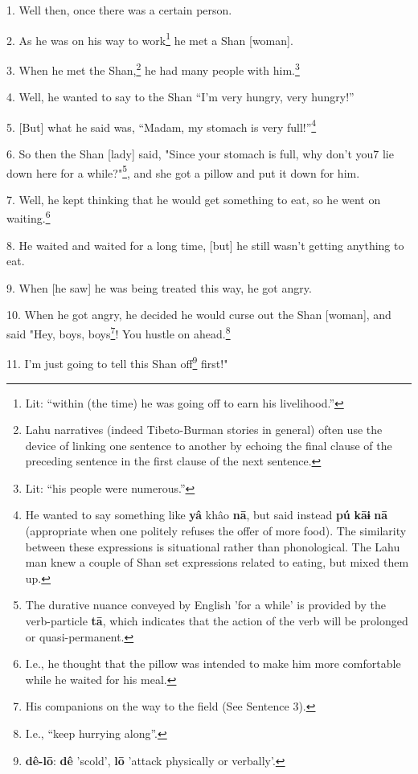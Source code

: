 \setcounter{footnote}{0}

1. Well then, once there was a certain person.

2. As he was on his way to work\footnote{Lit: ``within (the time) he was going off to earn his livelihood.''} he met a Shan [woman].

3. When he met the Shan,\footnote{Lahu narratives (indeed Tibeto-Burman stories in general) often use the device of linking one sentence to another by echoing the final clause of the preceding sentence in the first clause of the next sentence.} he had many people with him.\footnote{Lit: ``his people were numerous.''}

4. Well, he wanted to say to the Shan ``I'm very hungry, very hungry!''

5. [But] what he said was, ``Madam, my stomach is very full!''\footnote{He wanted to say something like \textbf{yâ} khâo \textbf{nā}, but said instead \textbf{pú} \textbf{kāɨ} \textbf{nā} (appropriate when one politely refuses the offer of more food). The similarity between these expressions is situational rather than phonological. The Lahu man knew a couple of Shan set expressions related to eating, but mixed them up.}

6. So then the Shan [lady] said, "Since your stomach is full, why don't
you7 lie down here for a while?"\footnote{The durative nuance conveyed by English 'for a while' is provided by the verb-particle \textbf{tā}, which indicates that the action of the verb will be prolonged or quasi-permanent.}, and she got a pillow and put it
down for him.

7. Well, he kept thinking that he would get something to eat, so he went on waiting.\footnote{I.e., he thought that the pillow was intended to make him more comfortable while he waited for his meal.}

8. He waited and waited for a long time, [but] he still wasn't getting anything
to eat.

9. When [he saw] he was being treated this way, he got angry.

10. When he got angry, he decided he would curse out the Shan [woman], and said
"Hey, boys, boys\footnote{His companions on the way to the field (See Sentence 3).}! You hustle on ahead.\footnote{I.e., ``keep hurrying along''.}

11. I'm just going to tell this Shan off\footnote{\textbf{dê-lō}: \textbf{dê} 'scold', \textbf{lō} 'attack physically or verbally'.} first!"


